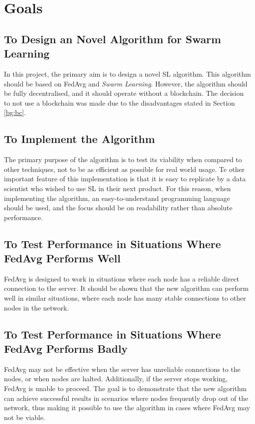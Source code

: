 \section{Goals}

\subsection{To Design an Novel Algorithm for Swarm Learning}
In this project, the primary aim is to design a novel SL algorithm. This algorithm should be based on FedAvg and \emph{Swarm Learning}. However, the algorithm should be fully decentralised, and it should operate without a blockchain. The decision to not use a blockchain was made due to the disadvantages stated in Section \ref{bg:bc}.

\subsection{To Implement the Algorithm}
The primary purpose of the algorithm is to test its viability when compared to other techniques, not to be as efficient as possible for real world usage. Te other important feature of this implementation is that it is easy to replicate by a data scientist who wished to use SL in their next product. For this reason, when implementing the algorithm, an easy-to-understand programming language should be used, and the focus should be on readability rather than absolute performance.

\subsection{To Test Performance in Situations Where FedAvg Performs Well}
FedAvg is designed to work in situations where each node has a reliable direct connection to the server. It should be shown that the new algorithm can perform well in similar situations, where each node has many stable connections to other nodes in the network.

\subsection{To Test Performance in Situations Where FedAvg Performs Badly}
FedAvg may not be effective when the server has unreliable connections to the nodes, or when nodes are halted. Additionally, if the server stops working, FedAvg is unable to proceed. The goal is to demonstrate that the new algorithm can achieve successful results in scenarios where nodes frequently drop out of the network, thus making it possible to use the algorithm in cases where FedAvg may not be viable.